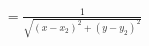 \documentclass[preview]{standalone}
\begin{document}
\begin{align*}
= \frac{1}{\sqrt{(x - x_2) ^ 2 + (y - y_2) ^ 2}}
\end{align*}
\end{document}
